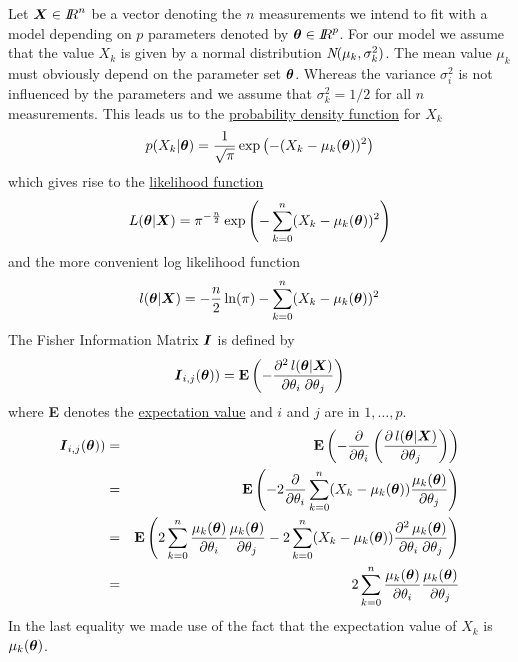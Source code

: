 \documentclass[12pt,english]{article}
\newcommand{\boldsymbol}[1]{\mbox{\boldmath $#1$}}
\newcommand{\R}{\mbox{$I\!\!R$}}
\begin{document}
Let $\boldsymbol{X} \in \R^{n}$ be a vector denoting the $n$
measurements we intend to fit with a model depending on $p$ parameters
denoted by $\boldsymbol{\theta} \in \R^{p}$. For our model we assume
that the value $X_k$ is given by a normal distribution
$\boldsymbol{\emph{N}}(\mu_k, \sigma_k^2)$. The mean value $\mu_k$
must obviously depend on the parameter set $\boldsymbol{\theta}$. Whereas
the variance $\sigma_i^2$ is not influenced by the
parameters and we assume that $\sigma_k^2 = 1/2$ for all $n$
measurements. This leads us to the 
\href{http://planetmath.org/encyclopedia/Distribution.html}
{probability density function} for
$X_k$
%
\begin{eqnarray}\label{PDF}
p(X_k|\boldsymbol{\theta}) = 
 \frac{1}{\sqrt{\pi}} 
 \exp\left(-(X_k - \mu_k(\boldsymbol{\theta}))^2\right)
\end{eqnarray}
%
which gives rise to the 
\href{http://planetmath.org/encyclopedia/LikelihoodFunction.html}
{likelihood function}
%
\begin{eqnarray}\label{likelyhood}
L(\boldsymbol{\theta}|\boldsymbol{X}) = 
 \pi^{-\frac{n}{2}} 
 \exp\left(- \sum_{k=0}^{n} (X_k - \mu_k(\boldsymbol{\theta}))^2\right)
\end{eqnarray}
%
and the more convenient log likelihood function
%
\begin{eqnarray}\label{loglikelyhood}
l(\boldsymbol{\theta}|\boldsymbol{X}) = 
 - \frac{n}{2}\ln(\pi) 
 - \sum_{k=0}^{n}(X_k - \mu_k(\boldsymbol{\theta}))^2
\end{eqnarray}
%
The Fisher Information Matrix $\boldsymbol{I}$ is defined by
\begin{eqnarray}\label{Fisher}
\boldsymbol{I}_{i, j}(\boldsymbol{\theta})) = 
\mbox{\bf E}
\left(
-\frac{\partial^2 \, l(\boldsymbol{\theta}|\boldsymbol{X})}
{\partial \theta_i \; \partial \theta_j}
\right)
\end{eqnarray}
where {\bf E} denotes the 
\href{http://planetmath.org/encyclopedia/ExpectedValue.html}
{expectation value} and $i$ and $j$ are in
$1, \ldots, p$.
%
\begin{eqnarray}
\boldsymbol{I}_{i, j}(\boldsymbol{\theta}))
& = &
\mbox{\bf E}
\left(
-\frac{\partial}
{\partial \theta_i}
\left(
\frac{\partial \, l(\boldsymbol{\theta}|\boldsymbol{X})}
{\partial \theta_j} 
\right)
\right)\\
& = &
\mbox{\bf E}
\left(
-2 \frac{\partial}
{\partial \theta_i}
\sum_{k=0}^{n}(X_k - \mu_k(\boldsymbol{\theta}))
\frac{\mu_k(\boldsymbol{\theta})}{\partial \theta_j}
\right)\\
& = &
\mbox{\bf E}
\left(
2 \sum_{k=0}^{n}
\frac{\mu_k(\boldsymbol{\theta})}{\partial \theta_i}
\frac{\mu_k(\boldsymbol{\theta})}{\partial \theta_j}
- 2 
\sum_{k=0}^{n}
(X_k - \mu_k(\boldsymbol{\theta})) 
\frac{\partial^2 \, \mu_k(\boldsymbol{\theta})}
{\partial \theta_i \; \partial \theta_j}
\right)\\
& = &
2 \sum_{k=0}^{n}
\frac{\mu_k(\boldsymbol{\theta})}{\partial \theta_i}
\frac{\mu_k(\boldsymbol{\theta})}{\partial \theta_j}
\end{eqnarray}
%
In the last equality we made use of the fact that the expectation
value of $X_k$ is $\mu_k(\boldsymbol{\theta})$.
\end{document}

